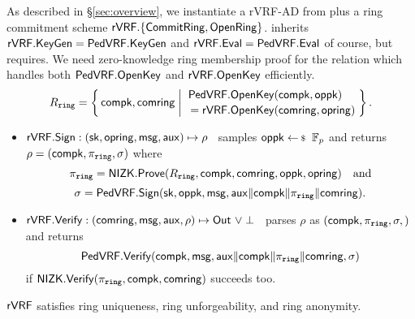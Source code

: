 \smallskip

As described in \S\ref{sec:overview},
we instantiate a rVRF-AD from \PedVRF plus a ring commitment scheme
 ${\mathsf{rVRF}}.\{ {\mathsf{CommitRing}}, {\mathsf{OpenRing}} \}$.
\rVRF inherits ${\mathsf{rVRF}}.{\mathsf{KeyGen}} = {\mathsf{PedVRF}}.{\mathsf{KeyGen}}$ and
 ${\mathsf{rVRF}}.{\mathsf{Eval}} = {\mathsf{PedVRF}}.{\mathsf{Eval}}$ of course, but requires.
We need zero-knowledge ring membership proof for the relation \Rring
which handles both ${\mathsf{PedVRF}}.{\mathsf{OpenKey}}$ and ${\mathsf{rVRF}}.{\mathsf{OpenKey}}$ efficiently.
$$ \Rring = \Setst{ \compk, \comring }{
    \eprint{ \exists \openpk,\openring \textrm{\ s.t.\ } }{}
    \genfrac{}{}{0pt}{}{\PedVRF.\OpenKey(\compk,\openpk) \quad}{\,\, = \rVRF.\OpenKey(\comring,\openring)}
} \mathperiod $$

\begin{itemize}
\item ${\mathsf{rVRF}}.{\mathsf{Sign}} : (\mathsf{sk},\mathsf{opring},\mathsf{msg},\mathsf{aux}) \mapsto \rho$ \,
 samples $\openpk \leftsample \F_p$ and
 returns $\rho = (\mathsf{compk},\pi_{\mathtt{ring}},\sigma)$ where      %
 $$ \pi_{\mathtt{ring}} = {\mathsf{NIZK}}.{\mathsf{Prove}}(R_{\mathtt{ring}},\mathsf{compk},\mathsf{comring},\mathsf{oppk},\mathsf{opring}) \quad\textrm{and} $$
 $$ \sigma = {\mathsf{PedVRF}}.{\mathsf{Sign}}(\mathsf{sk},\mathsf{oppk},\mathsf{msg},\mathsf{aux} \| \mathsf{compk} \| \pi_{\mathtt{ring}} \| \mathsf{comring}) . $$ %
\item ${\mathsf{rVRF}}.{\mathsf{Verify}} : (\mathsf{comring},\mathsf{msg},\mathsf{aux},\rho) \mapsto {\ensuremath{\mathsf{Out}}} \,\, \lor \perp$ \,
 parses $\rho$ as $(\mathsf{compk},\pi_{\mathtt{ring}},\sigma,)$ and returns
 $$ {\mathsf{PedVRF}}.{\mathsf{Verify}}(\mathsf{compk},\mathsf{msg},\mathsf{aux} \| \mathsf{compk} \| \pi_{\mathtt{ring}} \| \mathsf{comring},\sigma) $$
 if ${\mathsf{NIZK}}.{\mathsf{Verify}}(\pi_{\mathtt{ring}},\mathsf{compk},\mathsf{comring})$ succeeds too.
\end{itemize}

\begin{proposition}\label{prop:pedersen_rvrf}
${\mathsf{rVRF}}$ satisfies ring uniqueness, ring unforgeability, and ring anonymity.
\end{proposition}






\endinput





TODO:  Eprint form?

